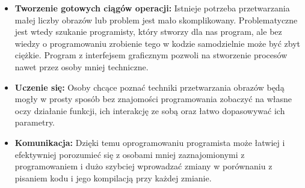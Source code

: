 \begin{itemize}
    \item \textbf{Tworzenie gotowych ciągów operacji:} 
    Istnieje potrzeba przetwarzania małej liczby obrazów lub problem jest mało skomplikowany. 
    Problematyczne jest wtedy szukanie programisty, który stworzy dla nas program, ale bez wiedzy o programowaniu zrobienie tego w kodzie samodzielnie może być zbyt ciężkie. 
    Program z interfejsem graficznym pozwoli na stworzenie procesów nawet przez osoby mniej techniczne.
    \item \textbf{Uczenie się:} 
    Osoby chcące poznać techniki przetwarzania obrazów będą mogły w prosty sposób bez znajomości programowania zobaczyć na własne oczy działanie funkcji, ich interakcję ze sobą oraz łatwo dopasowywać ich parametry. 
    \item \textbf{Komunikacja:} 
    Dzięki temu oprogramowaniu programista może łatwiej i efektywniej porozumieć się z osobami mniej zaznajomionymi z programowaniem i dużo szybciej wprowadzać zmiany w porównaniu z pisaniem kodu i jego kompilacją przy każdej zmianie.
\end{itemize}